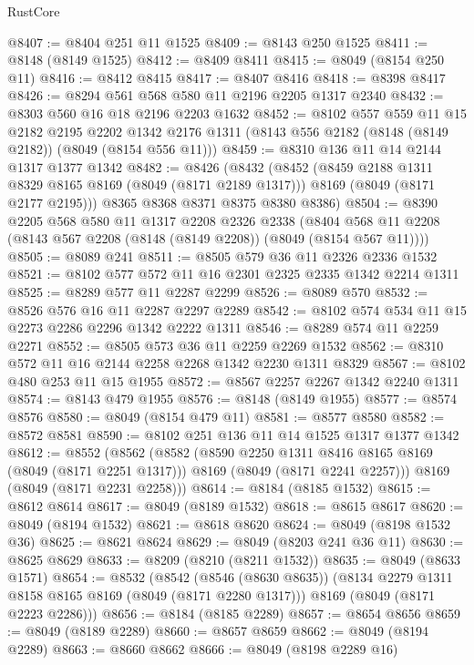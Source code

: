 \begin{lexlean}{RustCore}
\begin{coremodule}
@8407 := @8404 @251 @11 @1525
@8409 := @8143 @250 @1525
@8411 := @8148 (@8149 @1525)
@8412 := @8409 @8411
@8415 := @8049 (@8154 @250 @11)
@8416 := @8412 @8415
@8417 := @8407 @8416
@8418 := @8398 @8417
@8426 := @8294 @561 @568 @580 @11 @2196 @2205 @1317 @2340
@8432 := @8303 @560 @16 @18 @2196 @2203 @1632
@8452 := @8102
    @557
    @559
    @11
    @15
    @2182
    @2195
    @2202
    @1342
    @2176
    @1311
    (@8143 @556 @2182 (@8148 (@8149 @2182)) (@8049 (@8154 @556 @11)))
@8459 := @8310 @136 @11 @14 @2144 @1317 @1377 @1342
@8482 := @8426
    (@8432
      (@8452
        (@8459 @2188 @1311 @8329 @8165 @8169 (@8049 (@8171 @2189 @1317)))
        @8169
        (@8049 (@8171 @2177 @2195)))
      @8365
      @8368
      @8371
      @8375
      @8380
      @8386)
@8504 := @8390
    @2205
    @568
    @580
    @11
    @1317
    @2208
    @2326
    @2338
    (@8404 @568 @11 @2208 (@8143 @567 @2208 (@8148 (@8149 @2208)) (@8049 (@8154 @567 @11))))
@8505 := @8089 @241
@8511 := @8505 @579 @36 @11 @2326 @2336 @1532
@8521 := @8102 @577 @572 @11 @16 @2301 @2325 @2335 @1342 @2214 @1311
@8525 := @8289 @577 @11 @2287 @2299
@8526 := @8089 @570
@8532 := @8526 @576 @16 @11 @2287 @2297 @2289
@8542 := @8102 @574 @534 @11 @15 @2273 @2286 @2296 @1342 @2222 @1311
@8546 := @8289 @574 @11 @2259 @2271
@8552 := @8505 @573 @36 @11 @2259 @2269 @1532
@8562 := @8310 @572 @11 @16 @2144 @2258 @2268 @1342 @2230 @1311 @8329
@8567 := @8102 @480 @253 @11 @15 @1955
@8572 := @8567 @2257 @2267 @1342 @2240 @1311
@8574 := @8143 @479 @1955
@8576 := @8148 (@8149 @1955)
@8577 := @8574 @8576
@8580 := @8049 (@8154 @479 @11)
@8581 := @8577 @8580
@8582 := @8572 @8581
@8590 := @8102 @251 @136 @11 @14 @1525 @1317 @1377 @1342
@8612 := @8552
    (@8562
      (@8582
        (@8590 @2250 @1311 @8416 @8165 @8169 (@8049 (@8171 @2251 @1317)))
        @8169
        (@8049 (@8171 @2241 @2257)))
      @8169
      (@8049 (@8171 @2231 @2258)))
@8614 := @8184 (@8185 @1532)
@8615 := @8612 @8614
@8617 := @8049 (@8189 @1532)
@8618 := @8615 @8617
@8620 := @8049 (@8194 @1532)
@8621 := @8618 @8620
@8624 := @8049 (@8198 @1532 @36)
@8625 := @8621 @8624
@8629 := @8049 (@8203 @241 @36 @11)
@8630 := @8625 @8629
@8633 := @8209 (@8210 (@8211 @1532))
@8635 := @8049 (@8633 @1571)
@8654 := @8532
    (@8542
      (@8546 (@8630 @8635))
      (@8134 @2279 @1311 @8158 @8165 @8169 (@8049 (@8171 @2280 @1317)))
      @8169
      (@8049 (@8171 @2223 @2286)))
@8656 := @8184 (@8185 @2289)
@8657 := @8654 @8656
@8659 := @8049 (@8189 @2289)
@8660 := @8657 @8659
@8662 := @8049 (@8194 @2289)
@8663 := @8660 @8662
@8666 := @8049 (@8198 @2289 @16)

\end{coremodule}
\end{lexlean}
